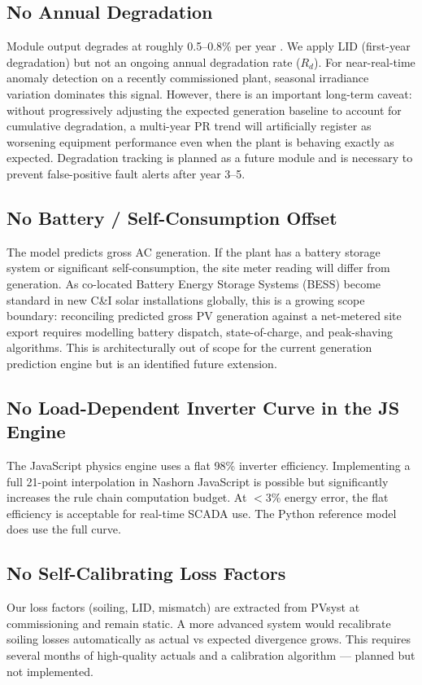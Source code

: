 \documentclass[11pt, a4paper]{article}
\begin{document}
\subsection{No Annual Degradation}
Module output degrades at roughly 0.5--0.8\% per year \cite{jordan2016robust}.
We apply LID (first-year degradation) but not an ongoing annual degradation rate
($R_d$). For near-real-time anomaly detection on a recently commissioned plant,
seasonal irradiance variation dominates this signal. However, there is an
important long-term caveat: without progressively adjusting the expected
generation baseline to account for cumulative degradation, a multi-year PR trend
will artificially register as worsening equipment performance even when the plant
is behaving exactly as expected. Degradation tracking is planned as a future
module and is necessary to prevent false-positive fault alerts after year 3--5.

\subsection{No Battery / Self-Consumption Offset}
The model predicts gross AC generation. If the plant has a battery storage
system or significant self-consumption, the site meter reading will differ from
generation. As co-located Battery Energy Storage Systems (BESS) become
standard in new C\&I solar installations globally, this is a growing scope
boundary: reconciling predicted gross PV generation against a net-metered
site export requires modelling battery dispatch, state-of-charge, and
peak-shaving algorithms. This is architecturally out of scope for the
current generation prediction engine but is an identified future extension.

\subsection{No Load-Dependent Inverter Curve in the JS Engine}
The JavaScript physics engine uses a flat 98\% inverter efficiency. Implementing
a full 21-point interpolation in Nashorn JavaScript is possible but
significantly increases the rule chain computation budget. At $<$3\% energy
error, the flat efficiency is acceptable for real-time SCADA use. The Python
reference model does use the full curve.

\subsection{No Self-Calibrating Loss Factors}
Our loss factors (soiling, LID, mismatch) are extracted from PVsyst at
commissioning and remain static. A more advanced system would recalibrate
soiling losses automatically as actual vs expected divergence grows. This
requires several months of high-quality actuals and a calibration algorithm ---
planned but not implemented.
\end{document}
